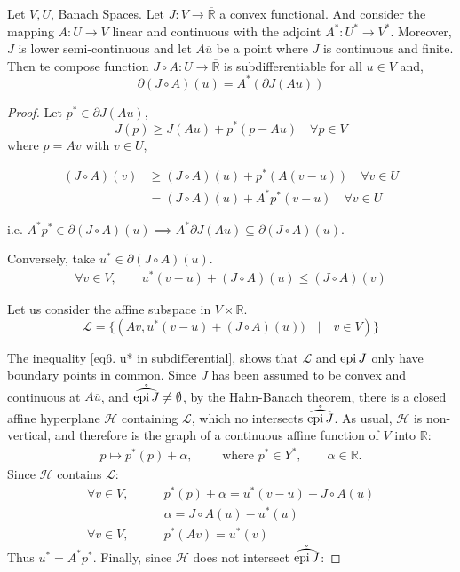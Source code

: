 \begin{theorem}
	Let $V, U$, Banach Spaces. Let $J:V \rightarrow \overline{\mathbb{R}}$ a convex functional. And consider the mapping $A: U\rightarrow V$ linear and continuous with the adjoint $A^*:U^*\rightarrow V^*$. Moreover, $J$ is lower semi-continuous and let $A\overline{u}$ be a point where $J$ is continuous and finite. Then te compose function $J\circ A: U\rightarrow \overline{\mathbb{R}}$ is subdifferentiable for all $u\in V$ and, 
	\[
		\partial(J\circ A)(u)=A^*\left(\partial J(Au)\right)
	\]
	\begin{proof}
		Let $p^*\in \partial J(Au)$,
		\[
			J(p)\geq J(Au)+p^*(p-Au) \quad \forall p \in V 
		\]
		where $p=Av$ with $v\in U$,
		
		\begin{align*}
			(J\circ A) (v) &\geq (J\circ A) (u)+p^*(A(v-u)) \quad \forall v \in U \\
						   &=(J\circ A)(u)+A^*p^*(v-u) \quad \forall v \in U
		\end{align*}
		
		i.e. $A^*p^* \in \partial (J\circ A)(u) \implies A^* \partial J(Au)\subseteq \partial (J\circ A)(u)$. 
		
		Conversely, take $u^*\in \partial (J\circ A)(u)$.
		\begin{align*}
		\label{eq6. u* in subdifferential}
			\forall v \in V, \qquad u^*(v-u)+(J\circ A)(u)\leq (J\circ A)(v)  \tag{\EODeer}
		\end{align*}
		 
		
Let us consider the affine subspace in $V\times \mathbb{R}$.
\begin{equation*}
\mathscr{L}=\{\left(Av, u^*(v-u)+(J\circ A)(u) )\quad | \quad v \in V\right)\}
\end{equation*}

The inequality \eqref{eq6. u* in subdifferential}, shows that $\mathscr{L}$ and $\mathrm{epi\,} J$ only have boundary points in common. Since $J$ has been assumed to be convex and continuous at $A\overline{u}$, and $\interior{\epi J} \neq \emptyset$, by the Hahn-Banach theorem, there is a closed affine hyperplane $\mathscr{H}$ containing $\mathscr{L}$, which no intersects $\interior{\epi J}$. As usual, $\mathscr{H}$ is non-vertical, and therefore is the graph of a continuous affine function of $V$ into $\mathbb{R}$:
\begin{align*}
	p \mapsto p^*(p)+\alpha, \qquad \text{ where } p^* \in Y^*, \qquad \alpha \in \mathbb{R}.
\end{align*}
Since $\mathscr{H}$ contains $\mathscr{L}$:
\begin{align*}
	\forall v \in V, \qquad& p^*(p)+\alpha = u^*(v-u)+J\circ A(u)\\
	& \alpha = J\circ A(u)-u^*(u)\\
	\forall v \in V, \qquad & p^*(Av)=u^*(v)
\end{align*}
Thus  $u^*=A^*p^*$. Finally, since $\mathscr{H}$ does not intersect $\interior{\epi J}$:


\end{proof}
\end{theorem}
